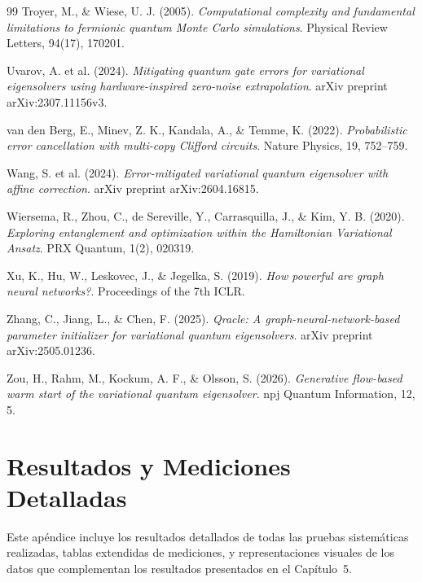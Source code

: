 \documentclass[11pt,a4paper,spanish]{book}
\begin{document}
\begin{thebibliography}{99}
 Troyer, M., \& Wiese, U. J. (2005). \emph{Computational complexity and fundamental limitations to fermionic quantum Monte Carlo simulations}. Physical Review Letters, 94(17), 170201.

 Uvarov, A. et al. (2024). \emph{Mitigating quantum gate errors for variational eigensolvers using hardware-inspired zero-noise extrapolation}. arXiv preprint arXiv:2307.11156v3.

 van den Berg, E., Minev, Z. K., Kandala, A., \& Temme, K. (2022). \emph{Probabilistic error cancellation with multi-copy Clifford circuits}. Nature Physics, 19, 752--759.

 Wang, S. et al. (2024). \emph{Error-mitigated variational quantum eigensolver with affine correction}. arXiv preprint arXiv:2604.16815.

 Wiersema, R., Zhou, C., de Sereville, Y., Carrasquilla, J., \& Kim, Y. B. (2020). \emph{Exploring entanglement and optimization within the Hamiltonian Variational Ansatz}. PRX Quantum, 1(2), 020319.

 Xu, K., Hu, W., Leskovec, J., \& Jegelka, S. (2019). \emph{How powerful are graph neural networks?}. Proceedings of the 7th ICLR.

 Zhang, C., Jiang, L., \& Chen, F. (2025). \emph{Qracle: A graph-neural-network-based parameter initializer for variational quantum eigensolvers}. arXiv preprint arXiv:2505.01236.

 Zou, H., Rahm, M., Kockum, A. F., \& Olsson, S. (2026). \emph{Generative flow-based warm start of the variational quantum eigensolver}. npj Quantum Information, 12, 5.

\end{thebibliography}



\appendix

\chapter{Resultados y Mediciones Detalladas}
\label{app:resultados}

Este apéndice incluye los resultados detallados de todas las pruebas sistemáticas realizadas, tablas extendidas de mediciones, y representaciones visuales de los datos que complementan los resultados presentados en el Capítulo~5.
\end{document}
